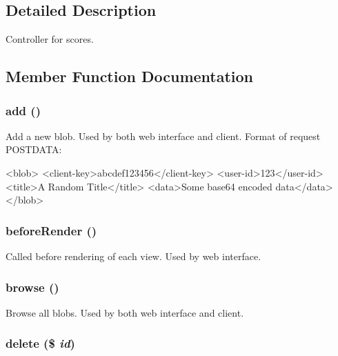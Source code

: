 \subsection{Detailed Description}
Controller for scores. 

\subsection{Member Function Documentation}
\hypertarget{class_blobs_controller_a837ba24a1c3095ae67613238d866f79a}{
\subsubsection[{add}]{\setlength{\rightskip}{0pt plus 5cm}add ()}}
\label{class_blobs_controller_a837ba24a1c3095ae67613238d866f79a}
Add a new blob. Used by both web interface and client. Format of request POSTDATA: 
\begin{DoxyCode}
 <blob>
   <client-key>abcdef123456</client-key>
   <user-id>123</user-id>
   <title>A Random Title</title>
   <data>Some base64 encoded data</data>
 </blob>
\end{DoxyCode}
 \hypertarget{class_blobs_controller_ac89dd29d2229bbc37879d31f95d06e97}{
\subsubsection[{beforeRender}]{\setlength{\rightskip}{0pt plus 5cm}beforeRender ()}}
\label{class_blobs_controller_ac89dd29d2229bbc37879d31f95d06e97}
Called before rendering of each view. Used by web interface. \hypertarget{class_blobs_controller_af41f268d662f2a4ffbe597d0580467a1}{
\subsubsection[{browse}]{\setlength{\rightskip}{0pt plus 5cm}browse ()}}
\label{class_blobs_controller_af41f268d662f2a4ffbe597d0580467a1}
Browse all blobs. Used by both web interface and client. \hypertarget{class_blobs_controller_a2f8258add505482d7f00ea26493a5723}{
\subsubsection[{delete}]{\setlength{\rightskip}{0pt plus 5cm}delete (\$ {\em id})}}
